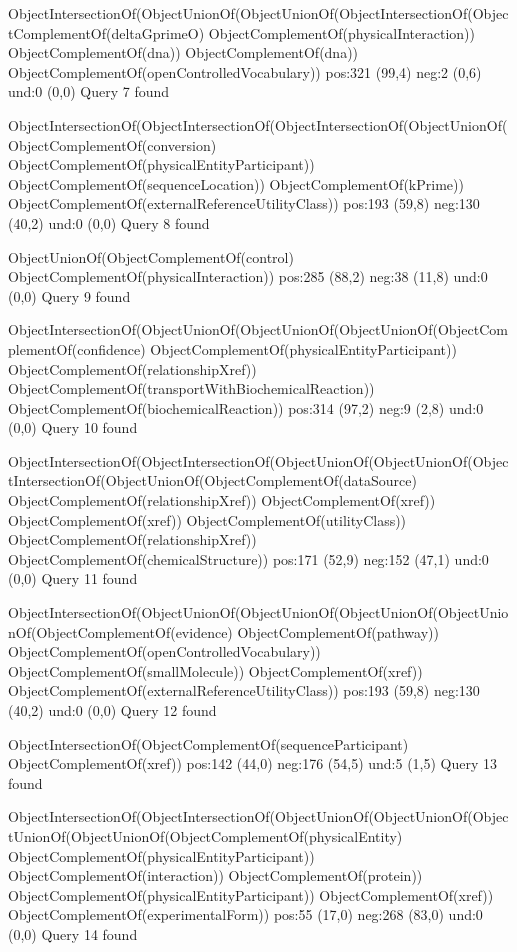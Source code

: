 ObjectIntersectionOf(ObjectUnionOf(ObjectUnionOf(ObjectIntersectionOf(ObjectComplementOf(deltaGprimeO) ObjectComplementOf(physicalInteraction)) ObjectComplementOf(dna)) ObjectComplementOf(dna)) ObjectComplementOf(openControlledVocabulary))
pos:321 (99,4)		 neg:2 (0,6)		 und:0 (0,0)
Query 7 found

ObjectIntersectionOf(ObjectIntersectionOf(ObjectIntersectionOf(ObjectUnionOf(ObjectComplementOf(conversion) ObjectComplementOf(physicalEntityParticipant)) ObjectComplementOf(sequenceLocation)) ObjectComplementOf(kPrime)) ObjectComplementOf(externalReferenceUtilityClass))
pos:193 (59,8)		 neg:130 (40,2)		 und:0 (0,0)
Query 8 found

ObjectUnionOf(ObjectComplementOf(control) ObjectComplementOf(physicalInteraction))
pos:285 (88,2)		 neg:38 (11,8)		 und:0 (0,0)
Query 9 found

ObjectIntersectionOf(ObjectUnionOf(ObjectUnionOf(ObjectUnionOf(ObjectComplementOf(confidence) ObjectComplementOf(physicalEntityParticipant)) ObjectComplementOf(relationshipXref)) ObjectComplementOf(transportWithBiochemicalReaction)) ObjectComplementOf(biochemicalReaction))
pos:314 (97,2)		 neg:9 (2,8)		 und:0 (0,0)
Query 10 found


ObjectIntersectionOf(ObjectIntersectionOf(ObjectUnionOf(ObjectUnionOf(ObjectIntersectionOf(ObjectUnionOf(ObjectComplementOf(dataSource) ObjectComplementOf(relationshipXref)) ObjectComplementOf(xref)) ObjectComplementOf(xref)) ObjectComplementOf(utilityClass)) ObjectComplementOf(relationshipXref)) ObjectComplementOf(chemicalStructure))
pos:171 (52,9)		 neg:152 (47,1)		 und:0 (0,0)
Query 11 found

ObjectIntersectionOf(ObjectUnionOf(ObjectUnionOf(ObjectUnionOf(ObjectUnionOf(ObjectComplementOf(evidence) ObjectComplementOf(pathway)) ObjectComplementOf(openControlledVocabulary)) ObjectComplementOf(smallMolecule)) ObjectComplementOf(xref)) ObjectComplementOf(externalReferenceUtilityClass))
pos:193 (59,8)		 neg:130 (40,2)		 und:0 (0,0)
Query 12 found

ObjectIntersectionOf(ObjectComplementOf(sequenceParticipant) ObjectComplementOf(xref))
pos:142 (44,0)		 neg:176 (54,5)		 und:5 (1,5)
Query 13 found

ObjectIntersectionOf(ObjectIntersectionOf(ObjectUnionOf(ObjectUnionOf(ObjectUnionOf(ObjectUnionOf(ObjectComplementOf(physicalEntity) ObjectComplementOf(physicalEntityParticipant)) ObjectComplementOf(interaction)) ObjectComplementOf(protein)) ObjectComplementOf(physicalEntityParticipant)) ObjectComplementOf(xref)) ObjectComplementOf(experimentalForm))
pos:55 (17,0)		 neg:268 (83,0)		 und:0 (0,0)
Query 14 found